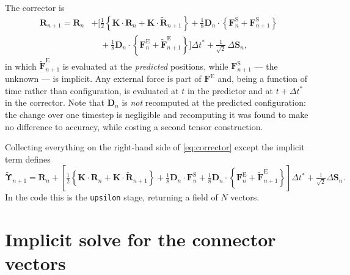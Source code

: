 \documentclass[11pt,a4paper]{report}
\newcommand{\D}{\bm{D}}
\newcommand{\R}{\bm{R}}
\newcommand{\dt}{\Delta t^{*}}
\newcommand{\code}[1]{\texttt{\seqsplitcode{#1}}}
\newcommand{\seqsplitcode}[1]{#1}
\begin{document}
The corrector is
\begin{equation}
\begin{aligned}
  \R_{n+1} = \R_n
    &+ \Big[\tfrac{1}{2}\left\{\bm{K}\cdot\R_n + \bm{K}\cdot\tilde{\R}_{n+1}\right\}
       + \tfrac{1}{8}\D_n\cdot\left\{\bm{F}^{\mathrm{S}}_n + \bm{F}^{\mathrm{S}}_{n+1}\right\}\\
    &\phantom{+\Big[}
       + \tfrac{1}{8}\D_n\cdot\left\{\bm{F}^{\mathrm{E}}_n + \tilde{\bm{F}}^{\mathrm{E}}_{n+1}\right\}\Big]\dt
       + \tfrac{1}{\sqrt{2}}\,\Delta\bm{S}_n ,
\end{aligned}
  \label{eq:corrector}
\end{equation}
in which $\tilde{\bm{F}}^{\mathrm{E}}_{n+1}$ is evaluated at the \emph{predicted}
positions, while $\bm{F}^{\mathrm{S}}_{n+1}$ --- the unknown --- is implicit. Any
external force is part of $\bm{F}^{\mathrm{E}}$ and, being a function of time
rather than configuration, is evaluated at $t$ in the predictor and at $t+\dt$ in
the corrector.
Note that $\D_n$ is \emph{not} recomputed at the predicted configuration: the
change over one timestep is negligible and recomputing it was found to make no
difference to accuracy, while costing a second tensor construction.

Collecting everything on the right-hand side of \eqref{eq:corrector} except the
implicit term defines
\begin{equation}
  \tilde{\bm{\Upsilon}}_{n+1} = \R_n
    + \left[\tfrac{1}{2}\left\{\bm{K}\cdot\R_n + \bm{K}\cdot\tilde{\R}_{n+1}\right\}
      + \tfrac{1}{8}\D_n\cdot\bm{F}^{\mathrm{S}}_n
      + \tfrac{1}{8}\D_n\cdot\left\{\bm{F}^{\mathrm{E}}_n+\tilde{\bm{F}}^{\mathrm{E}}_{n+1}\right\}\right]\dt
    + \tfrac{1}{\sqrt{2}}\Delta\bm{S}_n .
  \label{eq:upsilon}
\end{equation}
In the code this is the \code{upsilon} stage, returning a field of $N$ vectors.

\section{Implicit solve for the connector vectors}
\end{document}
